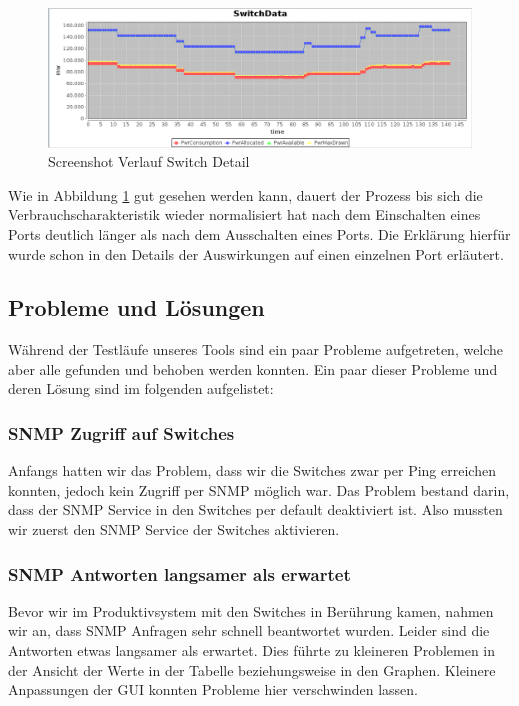 \begin{figure}[h]
    \centering
    \leavevmode
    \includegraphics[width=1.0\linewidth]{figures/switchConsequences}
    \caption{Screenshot Verlauf Switch Detail}
    \label{fig:switchDetails}
\end{figure}

Wie in Abbildung \ref{fig:switchDetails} gut gesehen werden kann, dauert der Prozess bis sich die Verbrauchscharakteristik wieder normalisiert hat nach dem Einschalten eines Ports deutlich länger als nach dem Ausschalten eines Ports. Die Erklärung hierfür wurde schon in den Details der Auswirkungen auf einen einzelnen Port erläutert.

\subsection{Probleme und Lösungen}
Während der Testläufe unseres Tools sind ein paar Probleme aufgetreten, welche aber alle gefunden und behoben werden konnten. Ein paar dieser Probleme und deren Lösung sind im folgenden aufgelistet:

\subsubsection*{SNMP Zugriff auf Switches}
Anfangs hatten wir das Problem, dass wir die Switches zwar per Ping erreichen konnten, jedoch kein Zugriff per SNMP möglich war. Das Problem bestand darin, dass der SNMP Service in den Switches per default deaktiviert ist. Also mussten wir zuerst den SNMP Service der Switches aktivieren.

\subsubsection*{SNMP Antworten langsamer als erwartet}
Bevor wir im Produktivsystem mit den Switches in Berührung kamen, nahmen wir an, dass SNMP Anfragen sehr schnell beantwortet wurden. Leider sind die Antworten etwas langsamer als erwartet. Dies führte zu kleineren Problemen in der Ansicht der Werte in der Tabelle beziehungsweise in den Graphen. Kleinere Anpassungen der GUI konnten Probleme hier verschwinden lassen.

